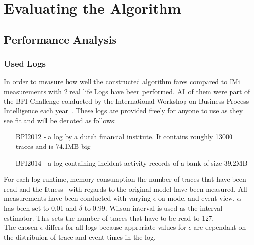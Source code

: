 \documentclass[
	a4paper,
	pagesize,
	pdftex,
	12pt,
	twoside, %
	BCOR=5mm, %
	ngerman,
	fleqn,
	final,
	]{scrartcl}
\begin{document}
\section{Evaluating the Algorithm}
\subsection{Performance Analysis}
\subsubsection{Used Logs}
In order to measure how well the constructed algorithm fares compared to IMi measurements with 2 real life Logs have been performed. All of them were part of the BPI Challenge conducted by the International Workshop on Business Process Intelligence each year~\cite{bpi}. These logs are provided freely for anyone to use as they see fit and will be denoted as follows:
\begin{itemize}
\item[BPI2012] - a log by a dutch financial institute. It contains roughly 13000 traces and is 74.1MB big 
\item[BPI2014] - a log containing incident activity records of a bank of size 39.2MB
\end{itemize}
For each log runtime, memory consumption the number of traces that have been read and the fitness~\cite{UsedFitnes} with regards to the original model have been measured. All measurements have been conducted with varying $\epsilon$ on model and event view. $\alpha$ has been set to 0.01 and $\delta$ to 0.99. Wilson interval is used as the interval estimator. This sets the number of traces that have to be read to 127.\\
The chosen $\epsilon$ differs for all logs because approriate values for $\epsilon$ are dependant on the distribuion of trace and event times in the log.
\end{document}
